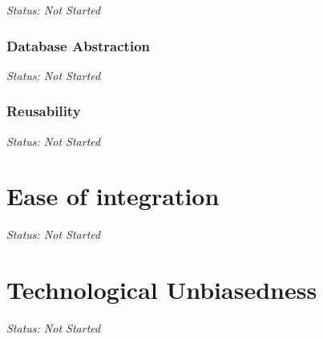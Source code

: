 \emph{Status: Not Started}

\subsubsection{Database Abstraction}

\emph{Status: Not Started}

\subsubsection{Reusability}

\emph{Status: Not Started}

\section{Ease of integration}

\emph{Status: Not Started}

\section{Technological Unbiasedness}

\emph{Status: Not Started}
